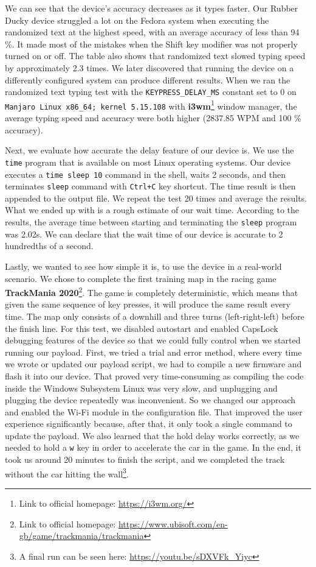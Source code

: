 We can see that the device's accuracy decreases as it types faster. Our Rubber Ducky device struggled a lot on the Fedora system when executing the randomized text at the highest speed, with an average accuracy of less than 94 \%. It made most of the mistakes when the Shift key modifier was not properly turned on or off. The table also shows that randomized text slowed typing speed by approximately 2.3 times. We later discovered that running the device on a differently configured system can produce different results. When we ran the randomized text typing test with the \verb|KEYPRESS_DELAY_MS| constant set to 0 on \verb|Manjaro Linux x86_64; kernel 5.15.108| with \textbf{i3wm}\footnote{Link to official homepage: \url{https://i3wm.org/}} window manager, the average typing speed and accuracy were both higher (2837.85 WPM and 100 \% accuracy).

Next, we evaluate how accurate the delay feature of our device is. We use the \verb|time| program that is available on most Linux operating systems. Our device executes a \verb|time sleep 10| command in the shell, waits 2 seconds, and then terminates \verb|sleep| command with \verb|Ctrl+C| key shortcut. The time result is then appended to the output file. We repeat the test 20 times and average the results. What we ended up with is a rough estimate of our wait time. According to the results, the average time between starting and terminating the \verb|sleep| program was 2.02s. We can declare that the wait time of our device is accurate to 2 hundredths of a second.

Lastly, we wanted to see how simple it is, to use the device in a real-world scenario. We chose to complete the first training map in the racing game \textbf{TrackMania 2020}\footnote{Link to official homepage: \url{https://www.ubisoft.com/en-gb/game/trackmania/trackmania}}. The game is completely deterministic, which means that given the same sequence of key presses, it will produce the same result every time. The map only consists of a downhill and three turns (left-right-left) before the finish line. For this test, we disabled autostart and enabled CapsLock debugging features of the device so that we could fully control when we started running our payload. First, we tried a trial and error method, where every time we wrote or updated our payload script, we had to compile a new firmware and flash it into our device. That proved very time-consuming as compiling the code inside the Windows Subsystem Linux was very slow, and unplugging and plugging the device repeatedly was inconvenient. So we changed our approach and enabled the Wi-Fi module in the configuration file. That improved the user experience significantly because, after that, it only took a single command to update the payload. We also learned that the hold delay works correctly, as we needed to hold a \verb|w| key in order to accelerate the car in the game. In the end, it took us around 20 minutes to finish the script, and we completed the track without the car hitting the wall\footnote{A final run can be seen here: \url{https://youtu.be/sDXVFk_Yiyc}}.


